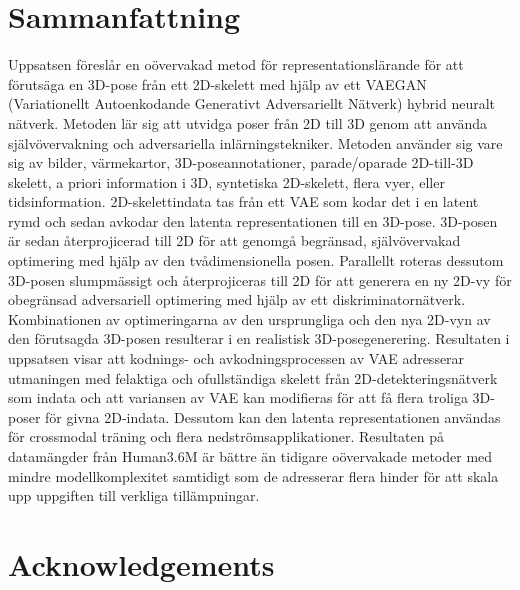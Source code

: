 \chapter*{Sammanfattning}
Uppsatsen föreslår en oövervakad metod för representationslärande för att förutsäga en 3D-­pose från ett 2D­-skelett med hjälp av ett VAE­GAN (Variationellt Autoenkodande Generativt Adversariellt Nätverk) hybrid neuralt nätverk. Metoden lär sig att utvidga poser från 2D till 3D genom att använda självövervakning och adversariella inlärningstekniker. Metoden använder sig vare sig av bilder, värmekartor, 3D­-poseannotationer, parade/oparade 2D­-till­-3D skelett, a priori information i 3D, syntetiska 2D-skelett, flera vyer, eller tidsinformation. 2D-skelettindata tas från ett VAE som kodar det i en latent rymd och sedan avkodar den latenta representationen till en 3D-­pose. 3D­-posen är sedan återprojicerad till 2D för att genomgå begränsad, självövervakad optimering med hjälp av den tvådimensionella posen. Parallellt roteras dessutom 3D-­posen slumpmässigt och återprojiceras till 2D för att generera en ny 2D­-vy för obegränsad adversariell optimering med hjälp av ett diskriminatornätverk. Kombinationen av optimeringarna av den ursprungliga och den nya 2D-vyn av den förutsagda 3D-­posen resulterar i en realistisk 3D-posegenerering. Resultaten i uppsatsen visar att kodnings-­ och avkodningsprocessen av VAE adresserar utmaningen med felaktiga och ofullständiga skelett från 2D­-detekteringsnätverk som indata och att variansen av VAE kan modifieras för att få flera troliga 3D­-poser för givna 2D­-indata. Dessutom kan den latenta representationen användas för crossmodal träning och flera nedströmsapplikationer. Resultaten på datamängder från Human3.6M är bättre än tidigare oövervakade metoder med mindre modellkomplexitet samtidigt som de adresserar flera hinder för att skala upp uppgiften till verkliga tillämpningar.

\newpage
\thispagestyle{plain}
\chapter*{Acknowledgements}

